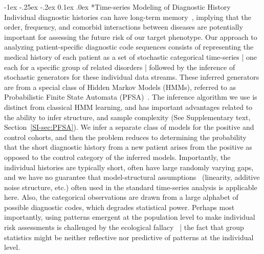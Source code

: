 \documentclass[onecolumn,,10pt]{IEEEtran}
\makeatletter
\renewcommand\subsection{\@startsection {section}{1}{\z@}%
  {-1ex \@plus -.25ex \@minus -.2ex}%
  {0.1ex \@plus.0ex}%
  {\fontsize{11}{12}\selectfont\bfseries\sffamily\color{DodgerBlue4}}}
\def\treatment{positive\xspace}
\makeatother
\begin{document}
\subsection*{Time-series Modeling of  Diagnostic History}
Individual diagnostic histories  can have long-term memory~\cite{ltgranger80}, implying that the order, frequency, and comorbid interactions between diseases are potentially  important for assessing the future risk of our target phenotype. 
Our  approach to analyzing patient-specific  diagnostic code sequences consists of representing the medical history of each patient as a set of stochastic categorical time-series | one each for a specific group of related disorders |  followed by the inference of stochastic generators  for  these individual data streams. These inferred generators are from a special class of  Hidden Markov Models (HMMs), referred to as Probabilistic Finite State Automata (PFSA)~\cite{CL12g}. The inference algorithm we use is distinct from classical HMM learning, and has important advantages related to the ability to infer structure, and sample complexity (See Supplementary text, Section~\ref{SI-sec:PFSA}). We infer a separate class of models for the \treatment and control cohorts, and then the problem reduces to determining the probability that the short diagnostic history from a  new  patient arises from the \treatment as opposed to the control category of the inferred models. Importantly,  the individual histories are typically short, often have large randomly varying  gaps, and we have no guarantee that model-structural assumptions~\cite{Stoyanov2010,Shumway2000} (linearity, additive noise structure, etc.)  often used in the standard time-series analysis is applicable here. Also, the categorical observations are drawn  from a large alphabet of possible  diagnostic codes, which degrades  statistical power. Perhaps most importantly,   using patterns emergent at the population level to make individual risk assessments is challenged by the  ecological fallacy~\cite{freedman04,rao92,bendel90} | the  fact that group statistics might be neither  reflective nor predictive   of patterns at the individual level.


 
\end{document}
